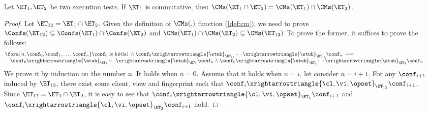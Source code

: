 \begin{theorem}
\label{thm:appendix-et-composition-1}
Let $\ET_1, \ET_2$ be two execution tests. If $\ET_1$ is commutative, 
then $\CMs(\ET_1 \cap \ET_2) = \CMs(\ET_1) \cap \CMs(\ET_2)$. 
\end{theorem}
\begin{proof}
Let \( \ET_{12} = \ET_1 \cap \ET_2 \).
Given the definition of \( \CMs(.) \) function (\cref{def:cm}), we need to prove \( \Confs(\ET_{12}) \subseteq \Confs(\ET_1) \cap \Confs(\ET_2) \) and \( \CMs(\ET_1) \cap \CMs(\ET_2) \subseteq \CMs(\ET_{12}) \)
To prove the former, it suffices to prove the follows:
\[
\begin{array}{@{}l}
    \fora{n,\conf_0, \conf_1, \dots, \conf_n} \conf_0 \text{ is initial } \land \conf_0 \xrightarrowtriangle{\stub}_{\ET_{12}} \cdots \xrightarrowtriangle{\stub}_{\ET_{12}} \conf_n \implies {} \\
    \quad \conf_0 \xrightarrowtriangle{\stub}_{\ET_{1}} \cdots \xrightarrowtriangle{\stub}_{\ET_{1}} \conf_n \land \conf_0 \xrightarrowtriangle{\stub}_{\ET_{2}} \cdots \xrightarrowtriangle{\stub}_{\ET_{2}} \conf_n 
\end{array}
\]
We prove it by induction on the number \( n \).
It holds when \( n = 0 \).
Assume that it holds when \( n = i \), let consider \( n = i + 1 \).
For any \( \conf_{i+1} \) induced by \( \ET_{12} \), there exist some client, view and fingerprint such that \( \conf_i \xrightarrowtriangle{\cl, \vi, \opset}_{\ET_{12}} \conf_{i+1} \).
Since \( \ET_{12} = \ET_1 \cap \ET_2 \), it is easy to see that \( \conf_i \xrightarrowtriangle{\cl, \vi, \opset}_{\ET_{1}} \conf_{i+1} \) and \( \conf_i \xrightarrowtriangle{\cl, \vi, \opset}_{\ET_{2}} \conf_{i+1} \) hold.


\end{proof}
